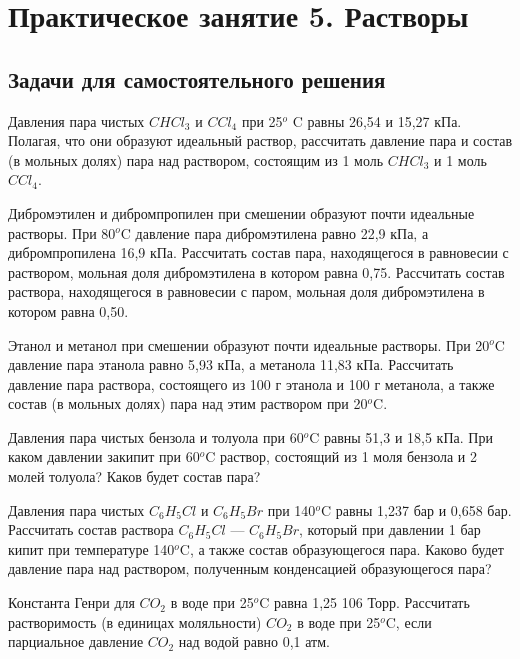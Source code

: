 \chapter{ Практическое занятие 5. Растворы}
\section{Задачи для самостоятельного решения}
\begin{Task}
Давления пара чистых $CHCl_{3}$ и $CCl_{4}$ при 25$^{o}$ C равны 26,54 и 15,27 кПа. Полагая, что они образуют идеальный раствор, рассчитать давление пара и состав (в мольных долях) пара над раствором, состоящим из 1 моль $CHCl_{3}$ и 1 моль $CCl_{4}$.
\end{Task}
\begin{Task}
Дибромэтилен и дибромпропилен при смешении образуют почти идеальные растворы. При 80$^{o}$C давление пара дибромэтилена равно 22,9 кПа, а дибромпропилена 16,9 кПа. Рассчитать состав пара, находящегося в равновесии с раствором, мольная доля дибромэтилена в котором равна 0,75. Рассчитать состав раствора, находящегося в равновесии с паром, мольная доля дибромэтилена в котором равна 0,50.
\end{Task}
\begin{Task}
Этанол и метанол при смешении образуют почти идеальные растворы. При 20$^{o}$C давление пара этанола равно 5,93 кПа, а метанола 11,83 кПа. Рассчитать давление пара раствора, состоящего из 100 г этанола и 100 г метанола, а также состав (в мольных долях) пара над этим раствором при 20$^{o}$C.
\end{Task}
\begin{Task}
Давления пара чистых бензола и толуола при 60$^{o}$C равны 51,3 и 18,5 кПа. При каком давлении закипит при 60$^{o}$C раствор, состоящий из 1 моля бензола и 2 молей толуола? Каков будет состав пара?
\end{Task}
\begin{Task}
Давления пара чистых $C_{6}H_{5}Cl$ и $C_{6}H_{5}Br$ при 140$^{o}$C равны 1,237 бар и 0,658 бар. Рассчитать состав раствора $C_{6}H_{5}Cl$ --- $C_{6}H_{5}Br$, который при давлении 1 бар кипит при температуре 140$^{o}$C, а также состав образующегося пара. Каково будет давление пара над раствором, полученным конденсацией образующегося пара?
\end{Task}
\begin{Task}
Константа Генри для $CO_{2}$ в воде при 25$^{o}$C равна 1,25  106 Торр. Рассчитать растворимость (в единицах моляльности) $CO_{2}$ в воде при 25$^{o}$C, если парциальное давление $CO_{2}$ над водой равно 0,1 атм.
\end{Task}
